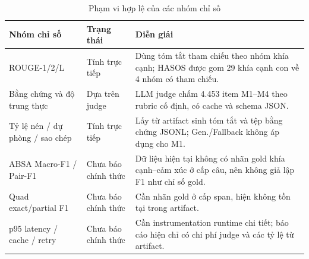 \documentclass[12pt,a4paper]{report}
\begin{document}
\begin{table}[tbp]
\centering
\caption{Phạm vi hợp lệ của các nhóm chỉ số}
\label{tab:metric-availability}
\begin{tabularx}{\textwidth}{L{0.23\textwidth} L{0.20\textwidth} Y}
\toprule
\textbf{Nhóm chỉ số} & \textbf{Trạng thái} & \textbf{Diễn giải} \\
\midrule
ROUGE-1/2/L & Tính trực tiếp & Dùng tóm tắt tham chiếu theo nhóm khía cạnh; HASOS được gom 29 khía cạnh con về 4 nhóm có tham chiếu. \\
Bằng chứng và độ trung thực & Dựa trên judge & LLM judge chấm 4.453 item M1--M4 theo rubric cố định, có cache và schema JSON. \\
Tỷ lệ nén / dự phòng / sao chép & Tính trực tiếp & Lấy từ artifact sinh tóm tắt và tệp bằng chứng JSONL; Gen./Fallback không áp dụng cho M1. \\
ABSA Macro-F1 / Pair-F1 & Chưa báo chính thức & Dữ liệu hiện tại không có nhãn gold khía cạnh--cảm xúc ở cấp câu, nên không giả lập F1 như chỉ số gold. \\
Quad exact/partial F1 & Chưa báo chính thức & Cần nhãn gold ở cấp span, hiện không tồn tại trong artifact. \\
p95 latency / cache / retry & Chưa báo chính thức & Cần instrumentation runtime chi tiết; báo cáo hiện chỉ có chi phí judge và các tỷ lệ từ artifact. \\
\bottomrule
\end{tabularx}
\end{table}
\end{document}
